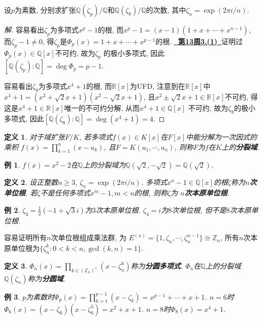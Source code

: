 \documentclass[12pt, a4paper, fontset=windows]{ctexart}
\newcommand{\Q}{\mathbb{Q}}
\newcommand{\R}{\mathbb{R}}
\newcommand{\Z}{\mathbb{Z}}
\newcommand{\isom}{\cong} %
\newcommand{\myref}[2][]{\hyperref[#1]{\bf\color{blue}\ {#2}\ }}
\newcommand{\unit}[1]{{#1}^\times}
\newtheorem*{definition}{定义}
\newtheorem*{example}{例}
\newenvironment{solution}{\begin{proof}[解]}{\end{proof}}
\begin{document}
设$p$为素数, 分别求扩张$\Q(\zeta_p)/\Q$和$\Q(\zeta_8)/\Q$的次数, 
其中$\zeta_n=\exp(2\pi i/n)$. 

\begin{solution}
容易看出$\zeta_p$为多项式$x^p-1$的根, 而$x^p-1=(x-1)(1+x+\cdots+x^{n-1})$, 
而$\zeta_p-1\ne 0$, 得$\zeta_p$是$\Phi_p(x)=1+x+\cdots+x^{p-1}$的根. 
\myref[irr-prime-cyclotomic]{第13周3.(1)}证明过$\Phi_p(x)\in\Q[x]$不可约, 故为$\zeta_p$
的极小多项式, 因此$[\Q(\zeta_p):\Q]=\deg\Phi_p=p-1$. 

容易看出$\zeta_8$为多项式$x^4+1$的根, 而$\R[x]$为UFD, 
注意到在$\R[x]$中$x^4+1=(x^2+\sqrt{2}x+1)(x^2-\sqrt{2}x+1)$, 
且$x^2\pm\sqrt{2}x+1\in\R[x]$不可约, 
得这是$x^4+1\in\R[x]$唯一的不可约分解, 从而$x^4+1\in\Q[x]$
不可约, 故为$\zeta_8$的极小多项式, 
因此$[\Q(\zeta_8):\Q]=\deg(x^4+1)=4$. 
\end{solution}

\begin{definition}
对于域扩张$F/K$, 若多项式$f(x)\in K[x]$在$F[x]$中能分解为一次因式的乘积
$f(x)=\prod^n_{k=1}(x-u_k)$, 且$F=K(u_1,\cdots,u_n)$, 
则称$F$为$f$在$K$上的{\bf 分裂域}. 
\end{definition}

\begin{example}
$f(x)=x^2-2$在$\Q$上的分裂域为$\Q(\sqrt{2},-\sqrt{2})=\Q(\sqrt{2})$. 
\end{example}

\begin{definition}
设正整数$n\ge 3$, $\zeta_n=\exp(2\pi i/n)$. 
多项式$x^n-1\in\Q[x]$的根$\zeta$称为{\bf $n$次单位根}. 
若$\zeta$不是任何多项式$x^m-1,m<n$的根, 则称$\zeta$为
{\bf $n$次本原单位根}. 
\end{definition}

\begin{example}
$\zeta_3=\frac12(-1+\sqrt{3}i)$为$3$次本原单位根. 
$\zeta_4=i$为$8$次单位根, 但不是$8$次本原单位根. 
\end{example}

容易证明所有$n$次单位根组成乘法群, 为
$E^{(n)}=\{1,\zeta_n,\cdots,\zeta_n^{n-1}\}\isom\Z_n$, 
所有$n$次本原单位根为$\{\zeta_n^k:0<k<n,\gcd(k,n)=1\}$. 

\begin{definition}
$\Phi_n(x)=\prod_{k\in\unit{(\Z_n)}}(x-\zeta_n^k)$称为{\bf 分圆多项式}. 
$\Phi_n$在$\Q$上的分裂域$\Q(\zeta_n)$称为{\bf 分圆域}. 
\end{definition}

\begin{example}
$p$为素数时$\Phi_p(x)=\prod^{p-1}_{k=1}(x-\zeta_k)=x^{p-1}+\cdots+x+1$. 
$n=6$时$\Phi_6(x)=(x-\zeta_6)(x-\zeta_6^5)=x^2+x+1$. $n=8$时$\Phi_8(x)=x^4+1$. 
\end{example}
\end{document}
